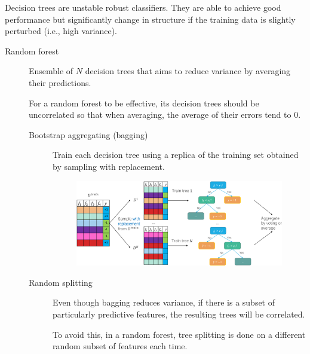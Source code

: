 \begin{description}
        \begin{remark}
            Decision trees are unstable robust classifiers. They are able to achieve good performance but significantly change in structure if the training data is slightly perturbed (i.e., high variance).
        \end{remark}

        \begin{description}
            \item[Random forest] 
                Ensemble of $N$ decision trees that aims to reduce variance by averaging their predictions.

                \begin{remark}
                    For a random forest to be effective, its decision trees should be uncorrelated so that when averaging, the average of their errors tend to $0$.
                \end{remark}

                \begin{description}
                    \item[Bootstrap aggregating (bagging)] 
                        Train each decision tree using a replica of the training set obtained by sampling with replacement.

                        \begin{figure}[H]
                            \raggedleft
                            \includegraphics[width=0.7\linewidth]{./img/_random_forest_bagging.pdf}
                        \end{figure}

                    \item[Random splitting] 
                        Even though bagging reduces variance, if there is a subset of particularly predictive features, the resulting trees will be correlated. 

                        To avoid this, in a random forest, tree splitting is done on a different random subset of features each time.


\end{description}
\end{description}
\end{description}
